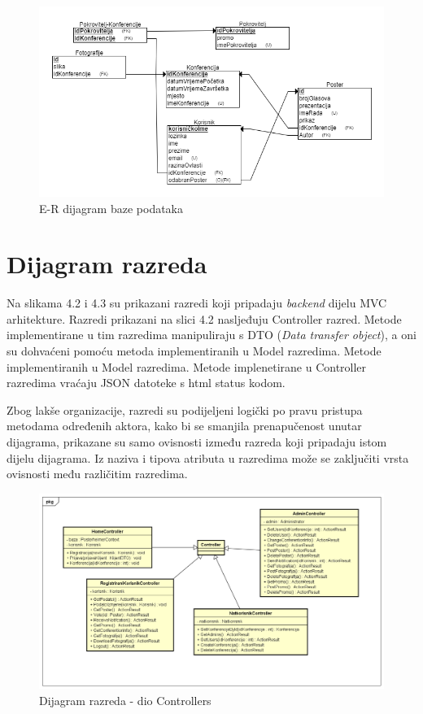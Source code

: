 					\begin{figure} [h]
						\includegraphics[width=\linewidth]{Slike/ERDijagram}
						\caption{E-R dijagram baze podataka}
					\end{figure}
			
			\eject
			
			
		\section{Dijagram razreda}
			
			Na slikama 4.2 i 4.3 su prikazani  razredi koji pripadaju \textit{backend} dijelu MVC arhitekture. Razredi prikazani na slici 4.2 nasljeđuju Controller razred. Metode implementirane u tim razredima manipuliraju s DTO (\textit{Data transfer object}), a oni su dohvaćeni pomoću metoda implementiranih u Model razredima. Metode implementiranih u Model razredima. Metode implenetirane u Controller razredima vraćaju JSON datoteke s html status kodom.
			
			Zbog lakše organizacije, razredi su podijeljeni logički po pravu pristupa metodama određenih aktora, kako bi se smanjila prenapučenost unutar dijagrama, prikazane su samo ovisnosti između razreda koji pripadaju istom dijelu dijagrama. Iz naziva i tipova atributa u razredima može se zaključiti vrsta ovisnosti među različitim razredima. 
			
			\begin{figure} [h]
				\includegraphics[width=\linewidth]{Slike/ClassDiagramControllers}
				\caption{Dijagram razreda - dio Controllers}
			\end{figure}
			
